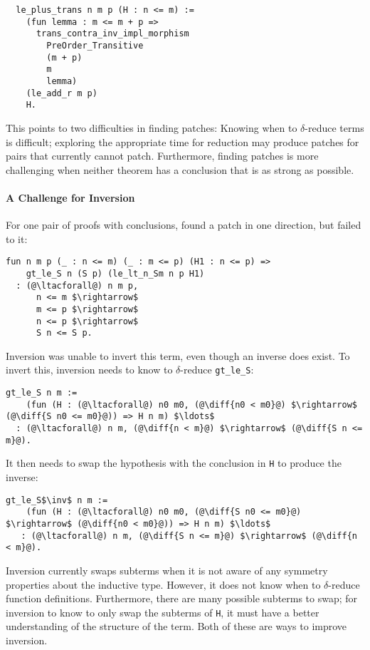 \begin{lstlisting}
  le_plus_trans n m p (H : n <= m) :=
    (fun lemma : m <= m + p =>
      trans_contra_inv_impl_morphism
        PreOrder_Transitive
        (m + p)
        m
        lemma)
    (le_add_r m p)
    H.
\end{lstlisting}
This points to two difficulties in finding patches: Knowing when to $\delta$-reduce terms 
is difficult; exploring the appropriate time for reduction
may produce patches for pairs that \sysname currently cannot patch.
Furthermore, finding patches is more challenging
when neither theorem has a conclusion that is as strong as possible.

\paragraph{A Challenge for Inversion} For one pair of proofs with  conclusions,
\sysname found a patch in one direction, but failed to  it:

\begin{lstlisting}[language=coq]
  fun n m p (_ : n <= m) (_ : m <= p) (H1 : n <= p) =>
    gt_le_S n (S p) (le_lt_n_Sm n p H1)
  : (@\ltacforall@) n m p,
      n <= m $\rightarrow$
      m <= p $\rightarrow$
      n <= p $\rightarrow$
      S n <= S p.
\end{lstlisting}
Inversion was unable to invert this term, even though an inverse does exist.
To invert this, inversion needs to know to $\delta$-reduce \lstinline{gt_le_S}:

\begin{lstlisting}[language=coq]
  gt_le_S n m :=
    (fun (H : (@\ltacforall@) n0 m0, (@\diff{n0 < m0}@) $\rightarrow$ (@\diff{S n0 <= m0}@)) => H n m) $\ldots$
  : (@\ltacforall@) n m, (@\diff{n < m}@) $\rightarrow$ (@\diff{S n <= m}@).
\end{lstlisting}
It then needs to swap the hypothesis with the conclusion in \lstinline{H} to produce the inverse:

\begin{lstlisting}[language=coq]
  gt_le_S$\inv$ n m :=
    (fun (H : (@\ltacforall@) n0 m0, (@\diff{S n0 <= m0}@) $\rightarrow$ (@\diff{n0 < m0}@)) => H n m) $\ldots$
   : (@\ltacforall@) n m, (@\diff{S n <= m}@) $\rightarrow$ (@\diff{n < m}@).
\end{lstlisting}

Inversion currently swaps subterms when it is not
aware of any symmetry properties about the inductive type. However,
it does not know when to $\delta$-reduce function definitions. Furthermore, 
there are many possible subterms to swap;
for inversion to know to only swap the subterms of \lstinline{H}, it must have a better
understanding of the structure of the term. Both of these are ways to improve inversion.

